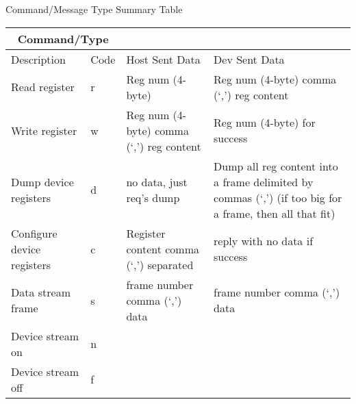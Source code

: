 \documentclass{customdocclass}
\begin{document}
\begin{center}
\small
Command/Message Type Summary Table
\begin{tabularx}{\textwidth}{|X|l|X|X|} \hline
\multicolumn{2}{|c|}{Command/Type} & & \\ \hline
Description & Code & Host Sent Data & Dev Sent Data \\ \hline
Read register & r & Reg num (4-byte) & Reg num (4-byte) comma (`,') reg content \\ \hline
Write register & w & Reg num (4-byte) comma (`,') reg content & Reg num (4-byte) for success \\ \hline
Dump device registers & d & no data, just req's dump & Dump all reg content into a frame delimited by commas (`,') (if too big for a frame, then all that fit) \\ \hline
Configure device registers & c & Register content comma (`,') separated & reply with no data if success \\ \hline
Data stream frame & s & frame number comma (`,') data &  frame number comma (`,') data \\ \hline
Device stream on & n & & \\ \hline
Device stream off & f & & \\ \hline
\end{tabularx}
\end{center}
\end{document}
